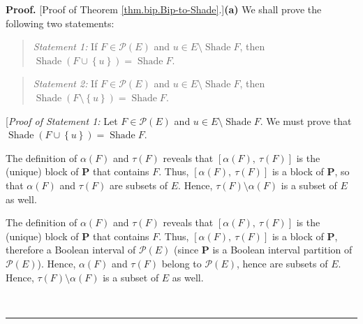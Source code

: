\documentclass[numbers=enddot,12pt,final,onecolumn]{scrartcl}%
\theoremstyle{definition}
\newenvironment{statement}{\begin{quote}}{\end{quote}}
\newenvironment{proof}[1][Proof]{\noindent\textbf{#1.} }{\ \rule{0.5em}{0.5em}}
\newenvironment{verlong}{}{}
\newenvironment{vershort}{}{}
\begin{document}
\begin{proof}
[Proof of Theorem \ref{thm.bip.Bip-to-Shade}.]\textbf{(a)} We shall prove the
following two statements:

\begin{statement}
\textit{Statement 1:} If $F\in\mathcal{P}\left(  E\right)  $ and $u\in
E\setminus\operatorname*{Shade}F$, then $\operatorname*{Shade}\left(
F\cup\left\{  u\right\}  \right)  =\operatorname*{Shade}F$.
\end{statement}

\begin{statement}
\textit{Statement 2:} If $F\in\mathcal{P}\left(  E\right)  $ and $u\in
E\setminus\operatorname*{Shade}F$, then $\operatorname*{Shade}\left(
F\setminus\left\{  u\right\}  \right)  =\operatorname*{Shade}F$.
\end{statement}

[\textit{Proof of Statement 1:} Let $F\in\mathcal{P}\left(  E\right)  $ and
$u\in E\setminus\operatorname*{Shade}F$. We must prove that
$\operatorname*{Shade}\left(  F\cup\left\{  u\right\}  \right)
=\operatorname*{Shade}F$.

\begin{vershort}
The definition of $\alpha\left(  F\right)  $ and $\tau\left(  F\right)  $
reveals that $\left[  \alpha\left(  F\right)  ,\ \tau\left(  F\right)
\right]  $ is the (unique) block of $\mathbf{P}$ that contains $F$. Thus,
$\left[  \alpha\left(  F\right)  ,\ \tau\left(  F\right)  \right]  $ is a
block of $\mathbf{P}$, so that $\alpha\left(  F\right)  $ and $\tau\left(
F\right)  $ are subsets of $E$. Hence, $\tau\left(  F\right)  \setminus
\alpha\left(  F\right)  $ is a subset of $E$ as well.
\end{vershort}

\begin{verlong}
The definition of $\alpha\left(  F\right)  $ and $\tau\left(  F\right)  $
reveals that $\left[  \alpha\left(  F\right)  ,\ \tau\left(  F\right)
\right]  $ is the (unique) block of $\mathbf{P}$ that contains $F$. Thus,
$\left[  \alpha\left(  F\right)  ,\ \tau\left(  F\right)  \right]  $ is a
block of $\mathbf{P}$, therefore a Boolean interval of $\mathcal{P}\left(
E\right)  $ (since $\mathbf{P}$ is a Boolean interval partition of
$\mathcal{P}\left(  E\right)  $). Hence, $\alpha\left(  F\right)  $ and
$\tau\left(  F\right)  $ belong to $\mathcal{P}\left(  E\right)  $, hence are
subsets of $E$. Hence, $\tau\left(  F\right)  \setminus\alpha\left(  F\right)
$ is a subset of $E$ as well.
\end{verlong}


\end{proof}
\end{document}
